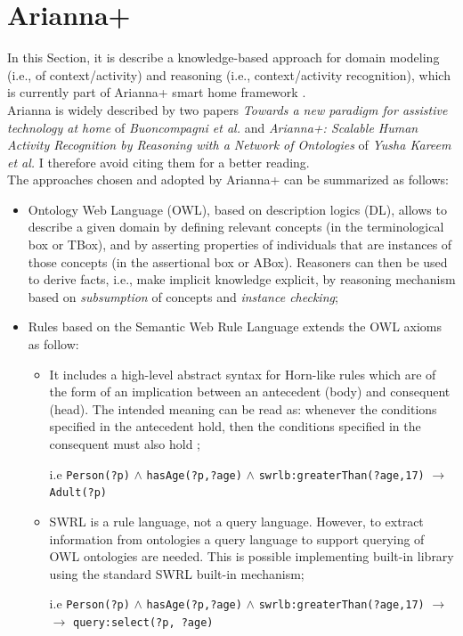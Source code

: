 \documentclass{thesisreport}
\begin{document}
 \section{Arianna+} \label{Arianna}    
 In this Section, it is describe a knowledge-based approach for domain modeling (i.e., of context/activity) and reasoning (i.e., context/activity recognition), which is currently part of Arianna+ smart home framework \cite{kareem2018arianna}. \\
 Arianna is widely described by two papers \textit{Towards a new paradigm for assistive technology at home} of \textit{Buoncompagni et al.} \cite{buoncompagni2017towards} and \textit{Arianna+: Scalable Human Activity Recognition by Reasoning with a Network of Ontologies} of \textit{Yusha Kareem et al.} \cite{kareem2018arianna} I therefore avoid citing them for a better reading. \\
 The approaches chosen and adopted by Arianna+ can be summarized as follows:
 \begin{itemize}
     \item Ontology Web Language (OWL), based on description logics (DL), allows to describe a given domain by defining relevant concepts (in the terminological box or TBox), and by asserting properties of individuals that are instances of those concepts (in the assertional box or ABox).
     Reasoners can then be used to derive facts, i.e., make implicit knowledge explicit, by reasoning mechanism \cite{donini1994deduction} based on \textit{subsumption} of concepts and \textit{instance checking};
     \item Rules based on the Semantic Web Rule Language extends the OWL axioms as follow:
    \begin{itemize}
        \item It includes a high-level abstract syntax for Horn-like rules which are of the form of an implication between an antecedent (body) and consequent (head). The intended meaning can be read as: whenever the conditions specified in the antecedent hold, then the conditions specified in the consequent must also hold \cite{horrocks2004swrl};
        
        i.e \texttt{Person(?p)} $\wedge$ \texttt{hasAge(?p,?age)} $\wedge$ \texttt{swrlb:greaterThan(?age,17)} $\rightarrow$ \texttt{Adult(?p)}
        
        \item SWRL is a rule language, not a query language. However, to extract information from ontologies a query language to support querying of OWL ontologies are needed.
        This is possible implementing  built-in library using the standard SWRL built-in mechanism; 
        
         i.e \texttt{Person(?p)} $\wedge$ \texttt{hasAge(?p,?age)} $\wedge$ \texttt{swrlb:greaterThan(?age,17)} $\rightarrow$ \\  $\rightarrow$ \texttt{query:select(?p, ?age)}
        
    \end{itemize}
 \end{itemize}
 
\end{document}
